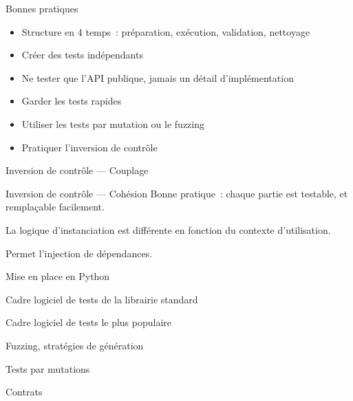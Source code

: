 \begin{frame}{Bonnes pratiques}
  \begin{itemize}[<+->]
    \item Structure en 4 temps~: préparation, exécution, validation, nettoyage
    \item Créer des tests indépendants
    \item Ne tester que l'API publique, jamais un détail d'implémentation
    \item Garder les tests rapides
    \item Utiliser les tests par mutation ou le fuzzing
    \item Pratiquer l'inversion de contrôle
  \end{itemize}
\end{frame}

\begin{frame}{Inversion de contrôle --- Couplage}
\end{frame}

\begin{frame}{Inversion de contrôle --- Cohésion}
  Bonne pratique~: chaque partie est testable, et remplaçable facilement.

  La logique d'instanciation est différente en fonction du contexte d'utilisation.

  Permet l'injection de dépendances.

\end{frame}

\begin{frame}{Mise en place en Python}
  \begin{description}[<+->]
    \item[\texttt{unittest}] Cadre logiciel de tests de la librairie standard
    \item[\texttt{pytest}] Cadre logiciel de tests le plus populaire
    \item[\texttt{hypothesis}] Fuzzing, stratégies de génération
    \item[\texttt{mutmut}] Tests par mutations
    \item[\texttt{deal}] Contrats
  \end{description}

\end{frame}
